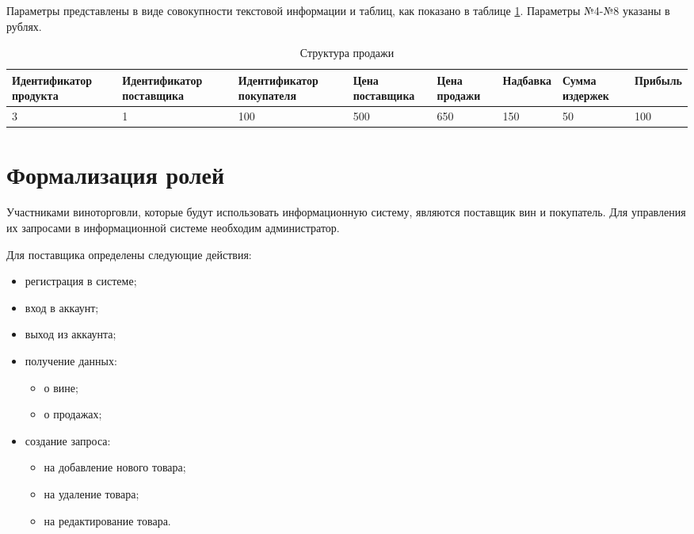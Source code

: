Параметры представлены в виде совокупности текстовой информации и таблиц, как показано в таблице \ref{sale_structure}. Параметры №4-№8 указаны в рублях.

\begin{table}[h]
    \begin{center}
        \begin{threeparttable}
        \captionsetup{justification=raggedright,singlelinecheck=off}
    		\caption{Структура продажи}
    		\label{sale_structure}
    		\scriptsize
        \begin{tabular}{|p{21mm}|p{21mm}|p{21mm}|p{10mm}|p{13mm}|p{14mm}|p{13mm}|p{12mm}|}
            \hline
            Идентификатор продукта & Идентификатор поставщика & Идентификатор покупателя & Цена поставщика & Цена продажи  & Надбавка & Сумма издержек & Прибыль \\ \hline
            3 & 1 & 100 & 500 & 650 & 150 & 50 & 100 \\ \hline
        \end{tabular}
    \end{threeparttable}
    \end{center}
\end{table}

\section{Формализация ролей}

Участниками виноторговли, которые будут использовать информационную систему, являются поставщик вин и покупатель. Для управления их запросами в информационной системе необходим администратор.

Для поставщика определены следующие действия:

\begin{itemize}
	\item регистрация в системе;
	\item вход в аккаунт;
	\item выход из аккаунта;
	\item получение данных:
		\begin{itemize}
			\item о вине;
			\item о продажах;
		\end{itemize}		 
	\item создание запроса:
		\begin{itemize}
			\item на добавление нового товара;
			\item на удаление товара;
			\item на редактирование товара.
		\end{itemize}
\end{itemize}

